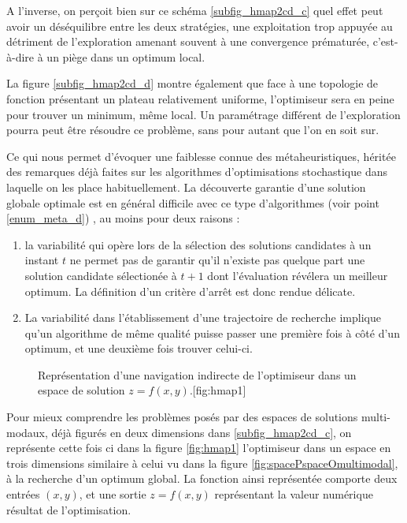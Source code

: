 A l'inverse, on perçoit bien sur ce schéma \ref{subfig_hmap2cd_c} quel effet peut avoir un déséquilibre entre les deux stratégies, une exploitation trop appuyée au détriment de l'exploration amenant souvent à une convergence  prématurée, c'est-à-dire à un piège dans un optimum local.

La figure \ref{subfig_hmap2cd_d} montre également que face à une topologie de fonction présentant un plateau relativement uniforme, l'optimiseur sera en peine pour trouver un minimum, même local. Un paramétrage différent de l'exploration pourra peut être résoudre ce problème, sans pour autant que l'on en soit sur.

Ce qui nous permet d'évoquer une faiblesse connue des métaheuristiques, héritée des remarques déjà faites sur les algorithmes d'optimisations stochastique  dans laquelle on les place habituellement. La découverte garantie d'une solution globale optimale est en général difficile avec ce type d'algorithmes (voir point \ref{enum_meta_d}) , au moins pour deux raisons :

\begin{enumerate}
\item la variabilité qui opère lors de la sélection des solutions candidates à un instant $t$ ne permet pas de garantir qu'il n'existe pas quelque part une solution candidate sélectionée à $t+1$ dont l'évaluation révélera un meilleur optimum. La définition d'un critère d'arrêt est donc rendue délicate.
\item La variabilité dans l'établissement d'une trajectoire de recherche implique qu'un algorithme de même qualité puisse passer une première fois à côté d'un optimum, et une deuxième fois trouver celui-ci.
\end{enumerate}

\begin{figure}[!htbp]
\begin{sidecaption}{Représentation d'une navigation indirecte de l'optimiseur dans un espace de solution $z = f(x,y)$.}[fig:hmap1]
  \centering
  \qquad
\end{sidecaption}
\end{figure}

Pour mieux comprendre les problèmes posés par des espaces de solutions multi-modaux, déjà figurés en deux dimensions dans \ref{subfig_hmap2cd_c}, on représente cette fois ci dans la figure \ref{fig:hmap1} l'optimiseur dans un espace en trois dimensions similaire à celui vu dans la figure \ref{fig:spacePspaceOmultimodal}, à la recherche d'un optimum global. La fonction ainsi représentée comporte deux entrées $(x,y)$, et une sortie $z = f(x,y)$ représentant la valeur numérique résultat de l'optimisation.

